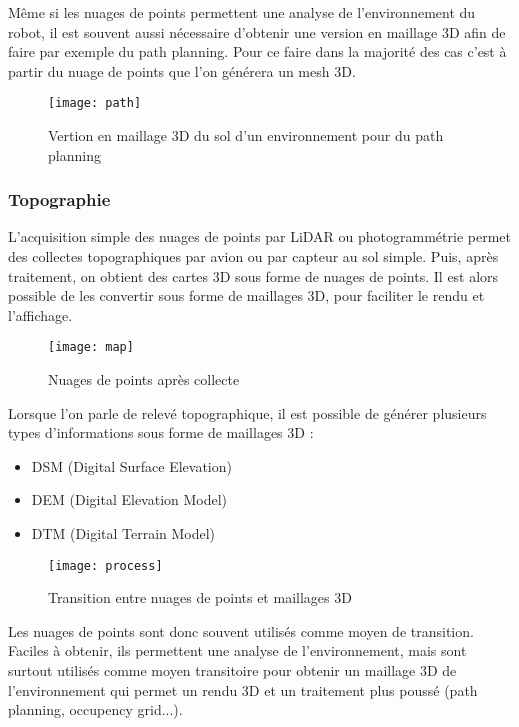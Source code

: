 \newpage
Même si les nuages de points permettent une analyse de l'environnement du robot, il est souvent aussi nécessaire d'obtenir une version en maillage 3D afin de faire par exemple du path planning. Pour ce faire dans la majorité des cas c'est à partir du nuage de points que l'on générera un mesh 3D.

\begin{figure}[h]
    \centering
    \texttt{[image: path]}
    \caption{Vertion en maillage 3D du sol d'un environnement pour du path planning}
    \label{fig:Path}
\end{figure}
\FloatBarrier

\subsubsection{Topographie}
L'acquisition simple des nuages de points par LiDAR ou photogrammétrie permet des collectes topographiques par avion ou par capteur au sol simple. Puis, après traitement, on obtient des cartes 3D sous forme de nuages de points. Il est alors possible de les convertir sous forme de maillages 3D, pour faciliter le rendu et l'affichage.

\begin{figure}[h]
    \centering
    \texttt{[image: map]}
    \caption{Nuages de points après collecte}
    \label{fig:map}
\end{figure}
\FloatBarrier

\newpage

Lorsque l'on parle de relevé topographique, il est possible de générer plusieurs types d'informations sous forme de maillages 3D :
\begin{itemize}
    \item DSM (Digital Surface Elevation)
    \item DEM (Digital Elevation Model)
    \item DTM (Digital Terrain Model)
\end{itemize}

\begin{figure}[h]
    \centering
    \texttt{[image: process]}
    \caption{Transition entre nuages de points et maillages 3D}
    \label{fig:car}
\end{figure}
\FloatBarrier


Les nuages de points sont donc souvent utilisés comme moyen de transition. Faciles à obtenir, ils permettent une analyse de l'environnement, mais sont surtout utilisés comme moyen transitoire pour obtenir un maillage 3D de l'environnement qui permet un rendu 3D et un traitement plus poussé (path planning, occupency grid...).


